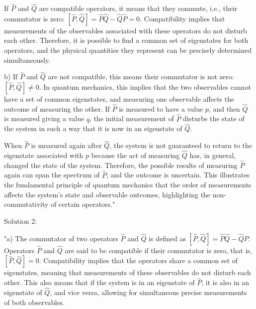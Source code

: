 If \( \hat{P} \) and \( \hat{Q} \) are compatible operators, it means that they commute, i.e., their commutator is zero: \([ \hat{P}, \hat{Q} ] = \hat{P}\hat{Q} - \hat{Q}\hat{P} = 0\). Compatibility implies that measurements of the observables associated with these operators do not disturb each other. Therefore, it is possible to find a common set of eigenstates for both operators, and the physical quantities they represent can be precisely determined simultaneously.

b) If \( \hat{P} \) and \( \hat{Q} \) are not compatible, this means their commutator is not zero: \([ \hat{P}, \hat{Q} ] \neq 0\). In quantum mechanics, this implies that the two observables cannot have a set of common eigenstates, and measuring one observable affects the outcome of measuring the other. If \( \hat{P} \) is measured to have a value \( p \), and then \( \hat{Q} \) is measured giving a value \( q \), the initial measurement of \( \hat{P} \) disturbs the state of the system in such a way that it is now in an eigenstate of \( \hat{Q} \).

When \( \hat{P} \) is measured again after \( \hat{Q} \), the system is not guaranteed to return to the eigenstate associated with \( p \) because the act of measuring \( \hat{Q} \) has, in general, changed the state of the system. Therefore, the possible results of measuring \( \hat{P} \) again can span the spectrum of \( \hat{P} \), and the outcome is uncertain. This illustrates the fundamental principle of quantum mechanics that the order of measurements affects the system's state and observable outcomes, highlighting the non-commutativity of certain operators."

Solution 2: 

"a) The commutator of two operators \( \hat{P} \) and \( \hat{Q} \) is defined as \([ \hat{P}, \hat{Q} ] = \hat{P}\hat{Q} - \hat{Q}\hat{P}\). Operators \( \hat{P} \) and \( \hat{Q} \) are said to be compatible if their commutator is zero, that is, \([ \hat{P}, \hat{Q} ] = 0\). Compatibility implies that the operators share a common set of eigenstates, meaning that measurements of these observables do not disturb each other. This also means that if the system is in an eigenstate of \( \hat{P} \), it is also in an eigenstate of \( \hat{Q} \), and vice versa, allowing for simultaneous precise measurements of both observables.


